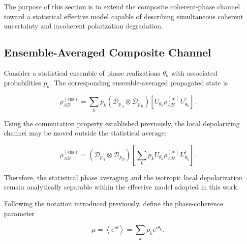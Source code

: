 \medskip

The purpose of this section is to extend the composite coherent-phase channel toward a statistical effective model capable of describing simultaneous coherent uncertainty and incoherent polarization degradation.

\medskip


\subsection{Ensemble-Averaged Composite Channel}

Consider a statistical ensemble of phase realizations \( \theta_k \) with associated probabilities \( p_k \). The corresponding ensemble-averaged propagated state is

\begin{equation}
\rho_{AB}^{(\mathrm{ens})}
=
\sum_k
p_k
\left(
\mathcal{D}_{p_A}
\otimes
\mathcal{D}_{p_B}
\right)
\left[
U_{\theta_k}
\rho_{AB}^{(\mathrm{in})}
U_{\theta_k}^{\dagger}
\right].
\label{eq:ensemble_composite_channel}
\end{equation}

\medskip

Using the commutation property established previously, the local depolarizing channel may be moved outside the statistical average:

\begin{equation}
\rho_{AB}^{(\mathrm{ens})}
=
\left(
\mathcal{D}_{p_A}
\otimes
\mathcal{D}_{p_B}
\right)
\left[
\sum_k
p_k
U_{\theta_k}
\rho_{AB}^{(\mathrm{in})}
U_{\theta_k}^{\dagger}
\right].
\label{eq:ensemble_channel_reordered}
\end{equation}

Therefore, the statistical phase averaging and the isotropic local depolarization remain analytically separable within the effective model adopted in this work.

\medskip

Following the notation introduced previously, define the phase-coherence parameter

\begin{equation}
\mu
=
\left\langle
e^{i\theta}
\right\rangle
=
\sum_k
p_k
e^{i\theta_k}.
\label{eq:ensemble_mu_definition}
\end{equation}

